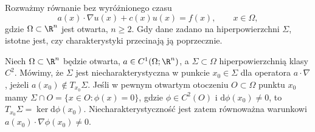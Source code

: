 Rozważmy równanie bez wyróżnionego czasu
\begin{equation}\label{eq:pde2-static}
 a(x)\cdot\nabla u(x)+c(x)u(x)=f(x),\qquad x\in\Omega,
\end{equation}
gdzie $\Omega\subset\R^n$ jest otwarta, $n\geq2$.
Gdy dane zadano na hiperpowierzchni $\Sigma$, istotne
jest, czy charakterystyki przecinają ją poprzecznie.

\begin{definicja}
Niech $\Omega\subset\R^n$ będzie otwarta, $a\in C^1(\Omega;\R^n)$,
a $\Sigma\subset\Omega$ hiperpowierzchnią klasy $C^2$.
Mówimy, że $\Sigma$ jest niecharakterystyczna w punkcie
$x_0\in\Sigma$ dla operatora $a\cdot\nabla$, jeżeli
$a(x_0)\notin T_{x_0}\Sigma$. Jeśli w pewnym otwartym
otoczeniu $O\subset\Omega$ punktu $x_0$ mamy
$\Sigma\cap O=\{x\in O:\phi(x)=0\}$, gdzie $\phi\in C^2(O)$
i $\mathrm d\phi(x_0)\ne0$, to
$T_{x_0}\Sigma=\ker\mathrm d\phi(x_0)$. Niecharakterystyczność
jest zatem równoważna warunkowi
$a(x_0)\cdot\nabla\phi(x_0)\ne0$.
\end{definicja}

